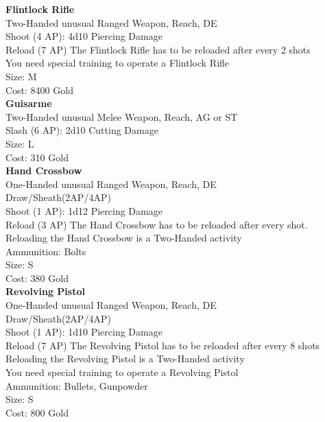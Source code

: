 \textbf{Flintlock Rifle}\label{weapon:flintlockRifle}\\
Two-Handed unusual Ranged Weapon,  Reach, DE\\
Shoot (4 AP): 4d10 Piercing Damage\\
Reload (7 AP) The Flintlock Rifle has to be reloaded after every 2 shots\\
You need special training to operate a Flintlock Rifle\\
Size: M\\
Cost: 8400 Gold\\

\textbf{Guisarme}\label{weapon:guisarme}\\
Two-Handed unusual Melee Weapon,  Reach, AG or ST\\
Slash (6 AP): 2d10 Cutting Damage\\
Size: L\\
Cost: 310 Gold\\

\textbf{Hand Crossbow}\label{weapon:handCrossbow}\\
One-Handed unusual Ranged Weapon,  Reach, DE\\
Draw/Sheath(2AP/4AP)\\
Shoot (1 AP): 1d12 Piercing Damage\\
Reload (3 AP) The Hand Crossbow has to be reloaded after every shot.\\
Reloading the Hand Crossbow is a Two-Handed activity\\
Ammunition: Bolts\\
Size: S\\
Cost: 380 Gold\\

\textbf{Revolving Pistol}\label{weapon:revolvingPistol}\\
One-Handed unusual Ranged Weapon,  Reach, DE\\
Draw/Sheath(2AP/4AP)\\
Shoot (1 AP): 1d10 Piercing Damage\\
Reload (7 AP) The Revolving Pistol has to be reloaded after every 8 shots\\
Reloading the Revolving Pistol is a Two-Handed activity\\
You need special training to operate a Revolving Pistol\\
Ammunition: Bullets, Gunpowder\\
Size: S\\
Cost: 800 Gold\\


